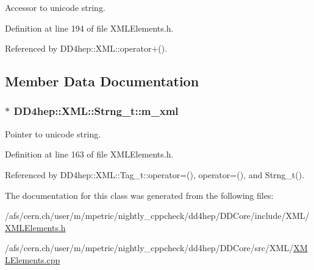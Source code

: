 Accessor to unicode string. 

Definition at line 194 of file XMLElements.h.

Referenced by DD4hep::XML::operator+().

\subsection{Member Data Documentation}
\hypertarget{class_d_d4hep_1_1_x_m_l_1_1_strng__t_a09fc5214cd993d1c0a7678c5a85850a8}{
\subsubsection[{m\_\-xml}]{$\ast$ {\bf DD4hep::XML::Strng\_\-t::m\_\-xml}}}
\label{class_d_d4hep_1_1_x_m_l_1_1_strng__t_a09fc5214cd993d1c0a7678c5a85850a8}


Pointer to unicode string. 

Definition at line 163 of file XMLElements.h.

Referenced by DD4hep::XML::Tag\_\-t::operator=(), operator=(), and Strng\_\-t().

The documentation for this class was generated from the following files:\begin{DoxyCompactItemize}
\item 
/afs/cern.ch/user/m/mpetric/nightly\_\-cppcheck/dd4hep/DDCore/include/XML/\hyperlink{_x_m_l_elements_8h}{XMLElements.h}\item 
/afs/cern.ch/user/m/mpetric/nightly\_\-cppcheck/dd4hep/DDCore/src/XML/\hyperlink{_x_m_l_elements_8cpp}{XMLElements.cpp}\end{DoxyCompactItemize}
